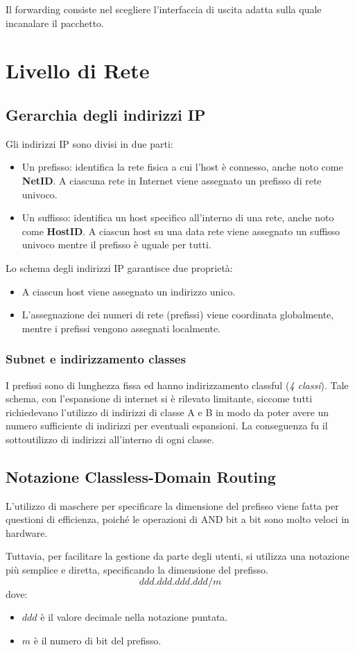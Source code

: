 \documentclass[oneside,a4paper,11pt]{book}
\theoremstyle{italicstyle}
\theoremstyle{normStyle}
\begin{document}
Il forwarding consiste nel scegliere l'interfaccia
di uscita adatta sulla quale incanalare il pacchetto. 
\section{Livello di Rete}
\subsection{Gerarchia degli indirizzi IP}
Gli indirizzi IP sono divisi in due parti:
\begin{itemize}
  \item Un prefisso: identifica la rete fisica a cui l'host è connesso, 
  anche noto come \textbf{NetID}. A ciascuna rete in Internet viene assegnato 
  un prefisso di rete univoco.
  \item Un suffisso: identifica un host specifico all'interno  di una 
  rete, anche noto come \textbf{HostID}. A ciascun host su una data rete viene 
  assegnato un suffisso univoco mentre il prefisso è uguale per tutti.
\end{itemize}
Lo schema degli indirizzi IP garantisce due proprietà:
\begin{itemize}
  \item A ciascun host viene assegnato un indirizzo unico.
  \item L'assegnazione dei numeri di rete (prefissi) viene coordinata 
  globalmente, mentre i prefissi vengono assegnati localmente.
\end{itemize}
\subsubsection{Subnet e indirizzamento classes}
I prefissi sono di lunghezza fissa ed hanno indirizzamento classful (\textit{4 classi}).
Tale schema, con l'espansione di internet si è rilevato limitante, siccome tutti richiedevano 
l'utilizzo di indirizzi di classe A e B in modo da poter avere un numero sufficiente di indirizzi 
per eventuali espansioni. La conseguenza fu il sottoutilizzo di indirizzi all'interno di ogni classe.
\subsection{Notazione Classless-Domain Routing}
L'utilizzo di maschere per specificare la dimensione del prefisso viene fatta per 
questioni di efficienza, poiché le operazioni di AND bit a bit sono molto veloci in hardware.

Tuttavia, per facilitare la gestione da parte degli utenti, si utilizza una
notazione più semplice e diretta, specificando la dimensione del prefisso.
\[
  ddd.ddd.ddd.ddd/m
\]
dove:
\begin{itemize}
  \item $ddd$ è il valore decimale nella notazione puntata.
  \item $m$ è il numero di bit del prefisso.
\end{itemize}
\end{document}
